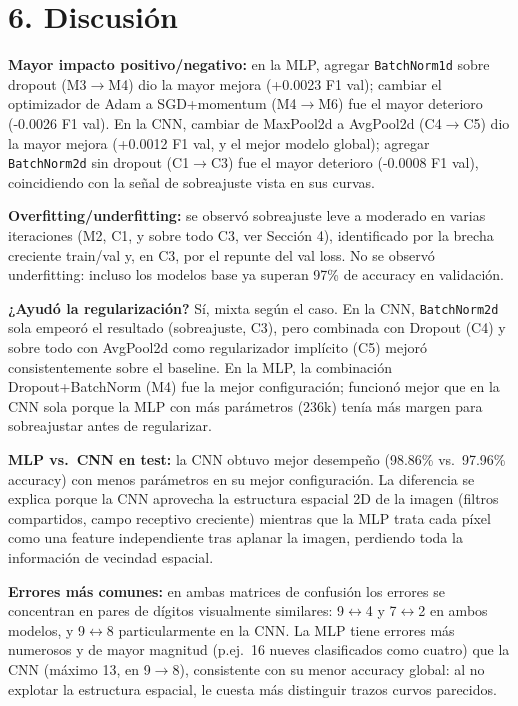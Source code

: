 \documentclass[9pt]{extarticle}
\begin{document}
\section*{6. Discusión}
\textbf{Mayor impacto positivo/negativo:} en la MLP, agregar \texttt{BatchNorm1d} sobre dropout (M3$\to$M4) dio la mayor mejora (+0.0023 F1 val); cambiar el optimizador de Adam a SGD+momentum (M4$\to$M6) fue el mayor deterioro (-0.0026 F1 val). En la CNN, cambiar de MaxPool2d a AvgPool2d (C4$\to$C5) dio la mayor mejora (+0.0012 F1 val, y el mejor modelo global); agregar \texttt{BatchNorm2d} sin dropout (C1$\to$C3) fue el mayor deterioro (-0.0008 F1 val), coincidiendo con la señal de sobreajuste vista en sus curvas.

\textbf{Overfitting/underfitting:} se observó sobreajuste leve a moderado en varias iteraciones (M2, C1, y sobre todo C3, ver Sección 4), identificado por la brecha creciente train/val y, en C3, por el repunte del val loss. No se observó underfitting: incluso los modelos base ya superan 97\% de accuracy en validación.

\textbf{¿Ayudó la regularización?} Sí, mixta según el caso. En la CNN, \texttt{BatchNorm2d} sola empeoró el resultado (sobreajuste, C3), pero combinada con Dropout (C4) y sobre todo con AvgPool2d como regularizador implícito (C5) mejoró consistentemente sobre el baseline. En la MLP, la combinación Dropout+BatchNorm (M4) fue la mejor configuración; funcionó mejor que en la CNN sola porque la MLP con más parámetros (236k) tenía más margen para sobreajustar antes de regularizar.

\textbf{MLP vs.\ CNN en test:} la CNN obtuvo mejor desempeño (98.86\% vs.\ 97.96\% accuracy) con menos parámetros en su mejor configuración. La diferencia se explica porque la CNN aprovecha la estructura espacial 2D de la imagen (filtros compartidos, campo receptivo creciente) mientras que la MLP trata cada píxel como una feature independiente tras aplanar la imagen, perdiendo toda la información de vecindad espacial.

\textbf{Errores más comunes:} en ambas matrices de confusión los errores se concentran en pares de dígitos visualmente similares: 9$\leftrightarrow$4 y 7$\leftrightarrow$2 en ambos modelos, y 9$\leftrightarrow$8 particularmente en la CNN. La MLP tiene errores más numerosos y de mayor magnitud (p.ej.\ 16 nueves clasificados como cuatro) que la CNN (máximo 13, en 9$\to$8), consistente con su menor accuracy global: al no explotar la estructura espacial, le cuesta más distinguir trazos curvos parecidos.
\end{document}
